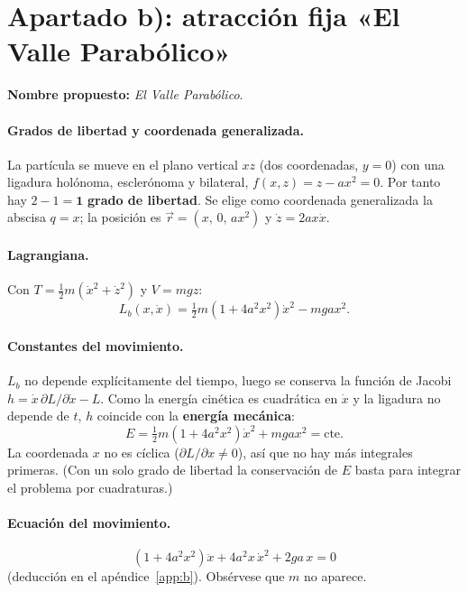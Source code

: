 \documentclass[11pt,a4paper]{article}
\begin{document}
\section{Apartado b): atracción fija «El Valle Parabólico»}\label{sec:b}
\textbf{Nombre propuesto:} \emph{El Valle Parabólico}.

\paragraph{Grados de libertad y coordenada generalizada.}
La partícula se mueve en el plano vertical $xz$ (dos coordenadas, $y=0$) con una ligadura holónoma, esclerónoma y bilateral,
$f(x,z)=z-ax^2=0$. Por tanto hay $2-1=\mathbf{1}$ \textbf{grado de libertad}. Se elige como coordenada generalizada la abscisa
$q=x$; la posición es $\vec r=(x,\,0,\,ax^2)$ y $\dot z=2ax\dot x$.

\paragraph{Lagrangiana.}
Con $T=\tfrac12m(\dot x^2+\dot z^2)$ y $V=mgz$:
\begin{equation}\label{eq:Lb}
 L_b(x,\dot x)=\tfrac12m\left(1+4a^2x^2\right)\dot x^2-mgax^2 .
\end{equation}

\paragraph{Constantes del movimiento.}
$L_b$ no depende explícitamente del tiempo, luego se conserva la función de Jacobi $h=\dot x\,\partial L/\partial\dot x-L$. Como la
energía cinética es cuadrática en $\dot x$ y la ligadura no depende de $t$, $h$ coincide con la \textbf{energía mecánica}:
\begin{equation}
 E=\tfrac12m\left(1+4a^2x^2\right)\dot x^2+mgax^2=\text{cte}.
\end{equation}
La coordenada $x$ no es cíclica ($\partial L/\partial x\neq0$), así que no hay más integrales primeras.
(Con un solo grado de libertad la conservación de $E$ basta para integrar el problema por cuadraturas.)

\paragraph{Ecuación del movimiento.}
\begin{equation}\label{eq:movb}
 \boxed{\ \left(1+4a^2x^2\right)\ddot x+4a^2x\,\dot x^2+2ga\,x=0\ }
\end{equation}
(deducción en el apéndice~\ref{app:b}). Obsérvese que $m$ no aparece.
\end{document}
